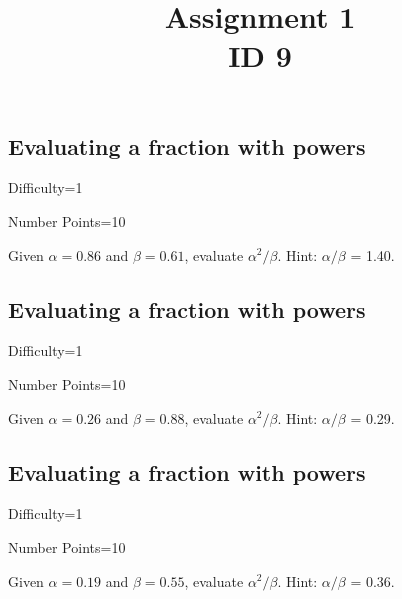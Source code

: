 \documentclass{article}
\title{Assignment 1 \\ ID 9}
\begin{document}
\maketitle

\section{} 



\subsection{Evaluating a fraction with powers}

Difficulty=1

Number Points=10

Given $\alpha = 0.86$ and $\beta = 0.61$, evaluate $\alpha^{2}/\beta$. Hint: $\alpha/\beta$ = 1.40.

\subsection{Evaluating a fraction with powers}

Difficulty=1

Number Points=10

Given $\alpha = 0.26$ and $\beta = 0.88$, evaluate $\alpha^{2}/\beta$. Hint: $\alpha/\beta$ = 0.29.

\subsection{Evaluating a fraction with powers}

Difficulty=1

Number Points=10

Given $\alpha = 0.19$ and $\beta = 0.55$, evaluate $\alpha^{2}/\beta$. Hint: $\alpha/\beta$ = 0.36.
\end{document}
